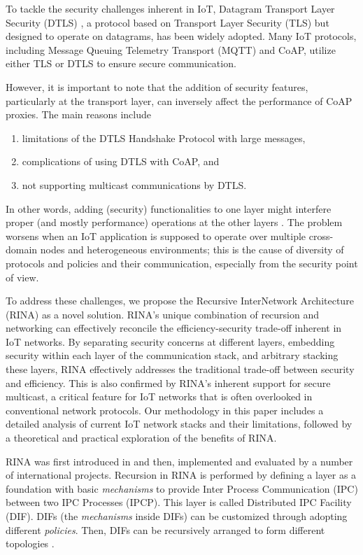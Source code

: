 \documentclass{ieeeaccess}
\begin{document}
To tackle the security challenges inherent in IoT, Datagram Transport Layer Security (DTLS) \cite{rfc6347}, a protocol based on Transport Layer Security (TLS) but designed to operate on datagrams, has been widely adopted. Many IoT protocols, including Message Queuing Telemetry Transport (MQTT) \cite{mqtt2014} and CoAP, utilize either TLS or DTLS to ensure secure communication.

However, it is important to note that the addition of security features, particularly at the transport layer, can inversely affect the performance of CoAP proxies. The main reasons include \cite{grammatikis2019securing}
\begin{enumerate}
	\item limitations of the DTLS Handshake Protocol with large messages,
	\item complications of using DTLS with CoAP, and
	\item not supporting multicast communications by DTLS.
\end{enumerate}

In other words, adding (security) functionalities to one layer might interfere proper (and mostly performance) operations at the other layers \cite{7005393}. The problem worsens when an IoT application is supposed to operate over multiple cross-domain nodes and heterogeneous environments; this is the cause of diversity of protocols and policies and their communication, especially from the security point of view.

To address these challenges, we propose the Recursive InterNetwork Architecture (RINA) as a novel solution. RINA's unique combination of recursion and networking can effectively reconcile the efficiency-security trade-off inherent in IoT networks. By separating security concerns at different layers, embedding security within each layer of the communication stack, and arbitrary stacking these layers, RINA effectively addresses the traditional trade-off between security and efficiency. This is also confirmed by RINA's inherent support for secure multicast, a critical feature for IoT networks that is often overlooked in conventional network protocols. Our methodology in this paper includes a detailed analysis of current IoT network stacks and their limitations, followed by a theoretical and practical exploration of the benefits of RINA. 

RINA was first introduced in \cite{Day:2008:PNA} and then, implemented and evaluated by a number of international projects. Recursion in RINA is performed by defining a layer as a foundation with basic \textit{mechanisms} to provide Inter Process Communication (IPC) between two IPC Processes (IPCP). This layer is called Distributed IPC Facility (DIF). DIFs (the \textit{mechanisms} inside DIFs) can be customized through adopting different \textit{policies}. Then, DIFs can be recursively arranged to form different topologies \cite{peymanICC16}. 
\end{document}
